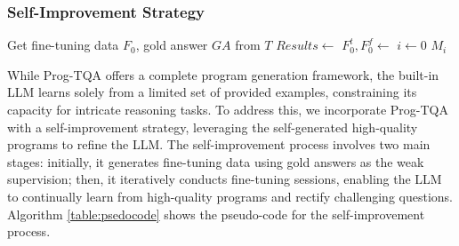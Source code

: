 \documentclass[10pt, a4paper]{article}
\begin{document}
\subsubsection{Self-Improvement Strategy}\label{sec:ift}
\begin{algorithm}
\caption{Self-improvement process}
\label{table:psedocode}
\small
{}
Get fine-tuning data $F_0$, gold answer $GA$ from $T$\;
$Results \leftarrow $ \;
$F_{0}^t,F_{0}^f \leftarrow $ \;
$i \leftarrow 0$\;
\Return ${M}_{i}$\;
\end{algorithm}

While Prog-TQA offers a complete program generation framework, the built-in LLM learns solely from a limited set of provided examples, constraining its capacity for intricate reasoning tasks. To address this, we incorporate Prog-TQA with a self-improvement strategy, leveraging the self-generated high-quality programs to refine the LLM. The self-improvement process involves two main stages: initially, it generates fine-tuning data using gold answers as the weak supervision; then, it iteratively conducts fine-tuning sessions, enabling the LLM to continually learn from high-quality programs and rectify challenging questions. Algorithm \ref{table:psedocode} shows the pseudo-code for the self-improvement process.
\end{document}
